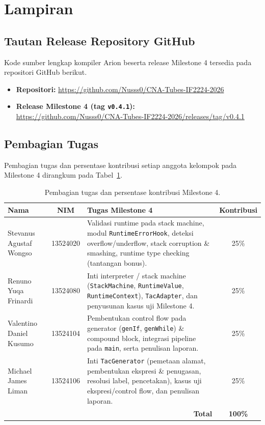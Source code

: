 \section{Lampiran}

\subsection{Tautan Release Repository GitHub}

Kode sumber lengkap kompiler Arion beserta release Milestone 4 tersedia pada
repositori GitHub berikut.

\begin{itemize}
  \item \textbf{Repositori:} \url{https://github.com/Nusss0/CNA-Tubes-IF2224-2026}
  \item \textbf{Release Milestone 4 (tag \texttt{v0.4.1}):}\\
        \url{https://github.com/Nusss0/CNA-Tubes-IF2224-2026/releases/tag/v0.4.1}
\end{itemize}

\subsection{Pembagian Tugas}

Pembagian tugas dan persentase kontribusi setiap anggota kelompok pada Milestone 4
dirangkum pada Tabel~\ref{tab:tugas}.

\begin{table}[H]
\centering
\caption{Pembagian tugas dan persentase kontribusi Milestone 4.}
\label{tab:tugas}
\renewcommand{\arraystretch}{1.3}
\begin{tabularx}{\textwidth}{@{}l c X c@{}}
\toprule
\textbf{Nama} & \textbf{NIM} & \textbf{Tugas Milestone 4} & \textbf{Kontribusi} \\
\midrule
Stevanus Agustaf Wongso & 13524020 &
Validasi runtime pada stack machine, modul \texttt{RuntimeErrorHook}, deteksi
overflow/underflow, stack corruption \& smashing, runtime type checking
(tantangan bonus). & 25\% \\
\addlinespace
Renuno Yuqa Frinardi & 13524080 &
Inti interpreter / stack machine (\texttt{StackMachine}, \texttt{RuntimeValue},
\texttt{RuntimeContext}), \texttt{TacAdapter}, dan penyusunan kasus uji
Milestone 4. & 25\% \\
\addlinespace
Valentino Daniel Kusumo & 13524104 &
Pembentukan control flow pada generator (\texttt{genIf}, \texttt{genWhile}) 
\& compound block, integrasi pipeline pada \texttt{main}, serta penulisan laporan. & 25\% \\
\addlinespace
Michael James Liman & 13524106 &
Inti \texttt{TacGenerator} (pemetaan alamat, pembentukan ekspresi \& penugasan,
resolusi label, pencetakan), kasus uji ekspresi/control flow, dan penulisan
laporan. & 25\% \\
\midrule
\multicolumn{3}{r}{\textbf{Total}} & \textbf{100\%} \\
\bottomrule
\end{tabularx}
\end{table}

